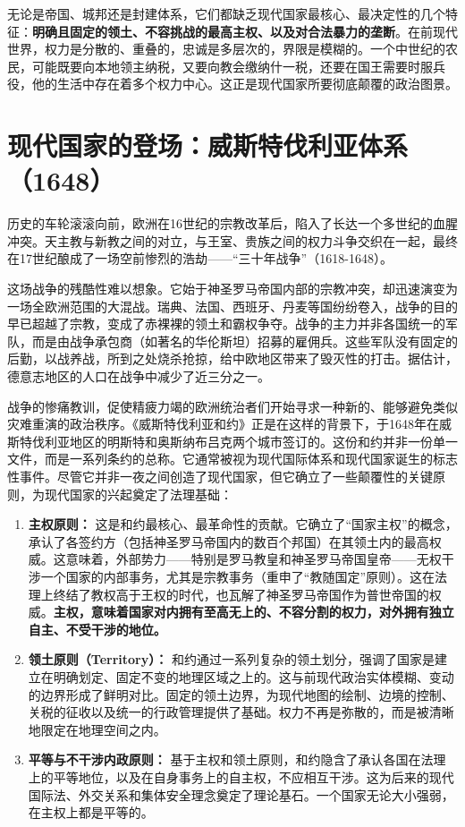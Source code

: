 无论是帝国、城邦还是封建体系，它们都缺乏现代国家最核心、最决定性的几个特征：\textbf{明确且固定的领土、不容挑战的最高主权、以及对合法暴力的垄断}。在前现代世界，权力是分散的、重叠的，忠诚是多层次的，界限是模糊的。一个中世纪的农民，可能既要向本地领主纳税，又要向教会缴纳什一税，还要在国王需要时服兵役，他的生活中存在着多个权力中心。这正是现代国家所要彻底颠覆的政治图景。

\hrulefill

\section{现代国家的登场：威斯特伐利亚体系（1648）}

历史的车轮滚滚向前，欧洲在16世纪的宗教改革后，陷入了长达一个多世纪的血腥冲突。天主教与新教之间的对立，与王室、贵族之间的权力斗争交织在一起，最终在17世纪酿成了一场空前惨烈的浩劫——“三十年战争”（1618-1648）。

这场战争的残酷性难以想象。它始于神圣罗马帝国内部的宗教冲突，却迅速演变为一场全欧洲范围的大混战。瑞典、法国、西班牙、丹麦等国纷纷卷入，战争的目的早已超越了宗教，变成了赤裸裸的领土和霸权争夺。战争的主力并非各国统一的军队，而是由战争承包商（如著名的华伦斯坦）招募的雇佣兵。这些军队没有固定的后勤，以战养战，所到之处烧杀抢掠，给中欧地区带来了毁灭性的打击。据估计，德意志地区的人口在战争中减少了近三分之一。

战争的惨痛教训，促使精疲力竭的欧洲统治者们开始寻求一种新的、能够避免类似灾难重演的政治秩序。《威斯特伐利亚和约》正是在这样的背景下，于1648年在威斯特伐利亚地区的明斯特和奥斯纳布吕克两个城市签订的。这份和约并非一份单一文件，而是一系列条约的总称。它通常被视为现代国际体系和现代国家诞生的标志性事件。尽管它并非一夜之间创造了现代国家，但它确立了一些颠覆性的关键原则，为现代国家的兴起奠定了法理基础：

\begin{enumerate}
    \item \textbf{主权原则：} 这是和约最核心、最革命性的贡献。它确立了“国家主权”的概念，承认了各签约方（包括神圣罗马帝国内的数百个邦国）在其领土内的最高权威。这意味着，外部势力——特别是罗马教皇和神圣罗马帝国皇帝——无权干涉一个国家的内部事务，尤其是宗教事务（重申了“教随国定”原则）。这在法理上终结了教权高于王权的时代，也瓦解了神圣罗马帝国作为普世帝国的权威。\textbf{主权，意味着国家对内拥有至高无上的、不容分割的权力，对外拥有独立自主、不受干涉的地位。}
    \item \textbf{领土原则（Territory）：} 和约通过一系列复杂的领土划分，强调了国家是建立在明确划定、固定不变的地理区域之上的。这与前现代政治实体模糊、变动的边界形成了鲜明对比。固定的领土边界，为现代地图的绘制、边境的控制、关税的征收以及统一的行政管理提供了基础。权力不再是弥散的，而是被清晰地限定在地理空间之内。
    \item \textbf{平等与不干涉内政原则：} 基于主权和领土原则，和约隐含了承认各国在法理上的平等地位，以及在自身事务上的自主权，不应相互干涉。这为后来的现代国际法、外交关系和集体安全理念奠定了理论基石。一个国家无论大小强弱，在主权上都是平等的。
\end{enumerate}

